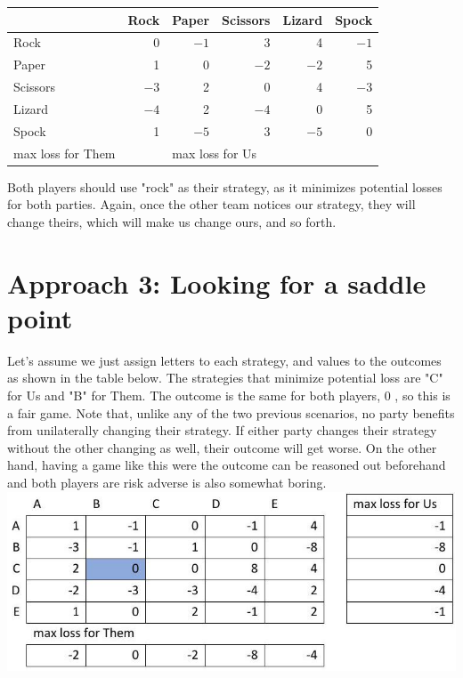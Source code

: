\documentclass[10pt]{article}
\begin{document}
\begin{tabular}{|l|r|r|r|r|r|}
\hline
 & \multicolumn{1}{|c|}{Rock} & Paper & Scissors & Lizard & Spock &  \\
\hline
Rock & 0 & $-1$ & 3 & 4 & $-1$ &  \\
\hline
Paper & 1 & 0 & $-2$ & $-2$ & 5 &  \\
\hline
Scissors & $-3$ & 2 & 0 & 4 & $-3$ &  \\
\hline
Lizard & $-4$ & 2 & $-4$ & 0 & 5 &  \\
\hline
Spock & 1 & $-5$ & 3 & $-5$ & 0 &  \\
\hline
max loss for Them &  & \multicolumn{5}{|l|}{max loss for Us} \\
\hline
\end{tabular}

Both players should use "rock" as their strategy, as it minimizes potential losses for both parties. Again, once the other team notices our strategy, they will change theirs, which will make us change ours, and so forth.

\section{Approach 3: Looking for a saddle point}
Let's assume we just assign letters to each strategy, and values to the outcomes as shown in the table below. The strategies that minimize potential loss are "C" for Us and "B" for Them. The outcome is the same for both players, 0 , so this is a fair game. Note that, unlike any of the two previous scenarios, no party benefits from unilaterally changing their strategy. If either party changes their strategy without the other changing as well, their outcome will get worse. On the other hand, having a game like this were the outcome can be reasoned out beforehand and both players are risk adverse is also somewhat boring.\\

\includegraphics[max width=\textwidth]{2022_07_05_5945264bba2a5f6ba667g-68}
\end{document}
